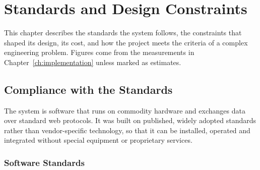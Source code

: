 %

\providecommand{\checkmark}{$\surd$}

\chapter{Standards and Design Constraints}
\label{ch:standards}

This chapter describes the standards the system follows, the constraints that
shaped its design, its cost, and how the project meets the criteria of a
complex engineering problem. Figures come from the measurements in
Chapter~\ref{ch:implementation} unless marked as estimates.

\section{Compliance with the Standards}
\label{sec:standards}

The system is software that runs on commodity hardware and exchanges data over
standard web protocols. It was built on published, widely adopted standards
rather than vendor-specific technology, so that it can be installed, operated
and integrated without special equipment or proprietary services.

\subsection{Software Standards}

